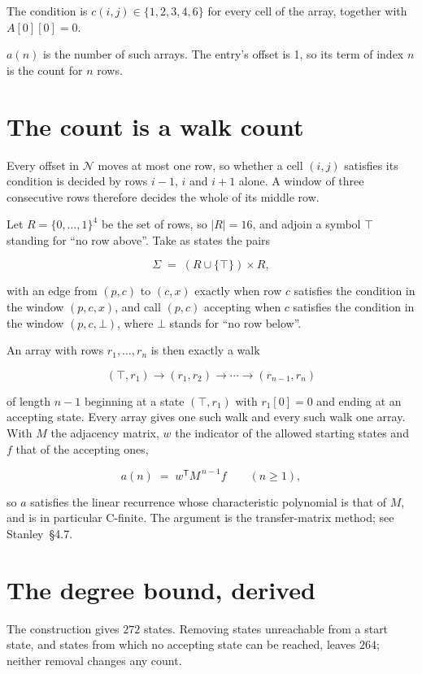 \documentclass[11pt]{article}
\theoremstyle{definition}
\begin{document}
The condition is $c(i,j) \in \{1, 2, 3, 4, 6\}$ for every cell of the array, together with $A[0][0]=0$.

$a(n)$ is the number of such arrays. The entry's offset is 1, so its term of index $n$ is the count for $n$ rows.

\section{The count is a walk count}

Every offset in $\mathcal{N}$ moves at most one row, so whether a cell $(i,j)$ satisfies its condition is decided by rows $i-1$, $i$ and $i+1$ alone. A window of three consecutive rows therefore decides the whole of its middle row.

Let $R = \{0,\dots,1\}^{4}$ be the set of rows, so $|R| = 16$, and adjoin a symbol $\top$ standing for ``no row above''. Take as states the pairs

\[\Sigma \;=\; (R \cup \{\top\}) \times R,\]

with an edge from $(p,c)$ to $(c,x)$ exactly when row $c$ satisfies the condition in the window $(p,c,x)$, and call $(p,c)$ accepting when $c$ satisfies the condition in the window $(p,c,\bot)$, where $\bot$ stands for ``no row below''.

An array with rows $r_1,\dots,r_n$ is then exactly a walk

\[(\top,r_1) \to (r_1,r_2) \to \cdots \to (r_{n-1},r_n)\]

of length $n-1$ beginning at a state $(\top,r_1)$ with $r_1[0]=0$ and ending at an accepting state. Every array gives one such walk and every such walk one array. With $M$ the adjacency matrix, $w$ the indicator of the allowed starting states and $f$ that of the accepting ones,

\[a(n) \;=\; w^{\mathsf T} M^{\,n-1} f \qquad (n \ge 1),\]

so $a$ satisfies the linear recurrence whose characteristic polynomial is that of $M$, and is in particular C-finite. The argument is the transfer-matrix method; see Stanley~\S4.7.

\section{The degree bound, derived}

The construction gives $272$ states. Removing states unreachable from a start state, and states from which no accepting state can be reached, leaves $264$; neither removal changes any count.
\end{document}
